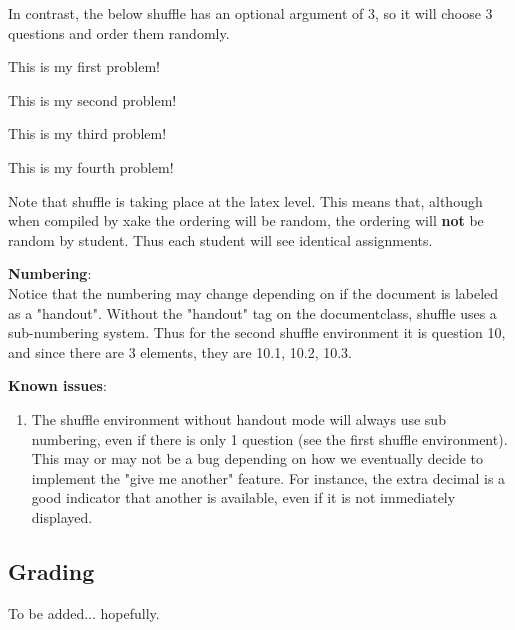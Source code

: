 \documentclass{ximera}
\begin{document}
In contrast, the below shuffle has an optional argument of 3, so it will choose 3 questions and order them randomly.

\begin{shuffle}[3]
\begin{problem}
This is my first problem!
\end{problem}

\begin{exercise}
This is my second problem!
\end{exercise}

\begin{exploration}
This is my third problem!
\end{exploration}

\begin{question}
This is my fourth problem!
\end{question}
\end{shuffle}

Note that shuffle is taking place at the latex level. This means that, although when compiled by xake the ordering will be random, the ordering will \textbf{not} be random by student. Thus each student will see identical assignments.

\textbf{Numbering}: \\
Notice that the numbering may change depending on if the document is labeled as a "handout". Without the "handout" tag on the documentclass, shuffle uses a sub-numbering system. Thus for the second shuffle environment it is question 10, and since there are 3 elements, they are 10.1, 10.2, 10.3.

\textbf{Known issues}:\\
\begin{enumerate}
\item The shuffle environment without handout mode will always use sub numbering, even if there is only 1 question (see the first shuffle environment). This may or may not be a bug depending on how we eventually decide to implement the "give me another" feature. For instance, the extra decimal is a good indicator that another is available, even if it is not immediately displayed.
\end{enumerate}



\subsection{Grading}
To be added... hopefully.
\end{document}
